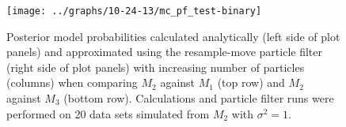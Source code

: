 \documentclass{article}
\begin{document}
\begin{figure}
\texttt{[image: ../graphs/10-24-13/mc\_pf\_test-binary]}
\caption{Posterior model probabilities calculated analytically (left side of plot panels) and approximated using the resample-move particle filter (right side of plot panels) with increasing number of particles (columns) when comparing $M_2$ against $M_1$ (top row) and $M_2$ against $M_3$ (bottom row). Calculations and particle filter runs were performed on 20 data sets simulated from $M_2$ with $\sigma^2 = 1$.} \label{fig:binary}
\end{figure}

\clearpage



\end{document}
